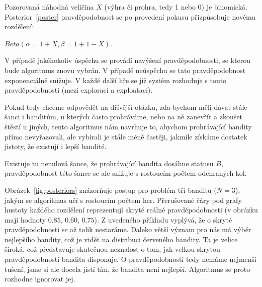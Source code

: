 \documentclass[thesis=M,czech]{FITthesis}[2014/05/07]
\begin{document}
Pozorovaná náhodná veličina $X$ (výhra či prohra, tedy 1 nebo 0) je binomická. Posterior~\ref{poster} pravděpodobnost se po provedení pokusu přizpůsobuje novému rozdělení:

\begin{center}
${Beta}(\alpha = 1 + X, \beta = 1 + 1 - X)$.
\end{center}

V případě jakéhokoliv úspěchu se provádí navýšení pravděpodobnosti, se kterou bude algoritmus znovu vybrán. V případě neúspěchu se tato pravděpodobnost exponenciálně snižuje. V každé další hře se již systém rozhoduje s touto pravděpodobností (mezí explorací a exploatací).

Pokud tedy chceme odpovědět na dřívější otázku, zda bychom měli dávat stále šanci i banditům, u kterých často prohráváme, nebo na ně zanevřít a zkoušet štěstí u jiných, tento algoritmus nám navrhuje to, abychom prohrávající bandity přímo nevyřazovali, ale vybírali je stále méně častěji, jakmile získáme dostatek jistoty, že existují i lepší bandité. 

Existuje tu nenulová šance, že prohrávající bandita dosáhne statusu $B$, pravděpodobnost této šance se ale snižuje s rostoucím počtem odehraných kol. 

Obrázek~\ref{fig:posteriors} znázorňuje postup pro problém tří banditů ($N = 3$), jakým se algoritmus učí s rostoucím počtem her. Přerušované čáry pod grafy hustoty každého rozdělení reprezentují skryté reálné pravděpodobnosti (v obrázku mají hodnoty $0.85$, $0.60$, $0.75$). Z uvedeného příkladu vyplývá, že o skryté pravděpodobnosti se až tolik nestaráme. Daleko větší význam pro nás má výběr nejlepšího bandity, což je vidět na distribuci červeného bandity. Ta je velice široká, což představuje skutečnou neznalost o tom, jak velkou skrytou pravděpodobností bandita disponuje. O pravděpodobnosti tedy nemáme nejmenší tušení, jsme si ale docela jistí tím, že bandita není nejlepší. Algoritmus se proto rozhodne ignorovat jej.
\end{document}

